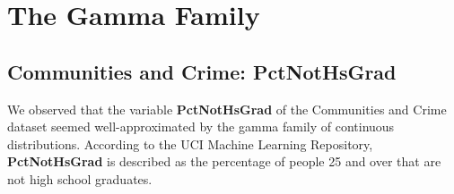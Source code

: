 \documentclass[12pt, letterpaper]{report}
\begin{document}
\maketitle
\chapter{The Gamma Family}
\section{Communities and Crime: PctNotHsGrad}

We observed that the variable \textbf{PctNotHsGrad} of the Communities and Crime dataset seemed well-approximated by the gamma family of continuous distributions.
According to the UCI Machine Learning Repository, \textbf{PctNotHsGrad} is described as the percentage of people 25 and over that are not high school graduates.
\end{document}
